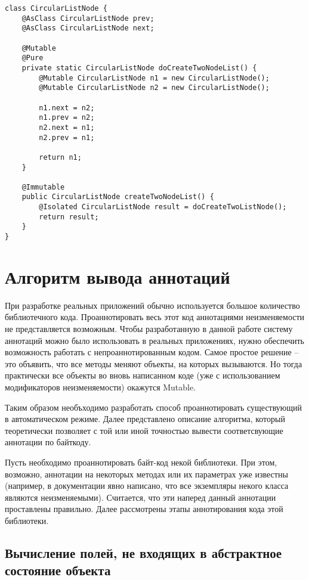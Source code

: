 \begin{lstlisting}[caption=CircularListNode.java, label=code:circular_list_node_isolated]
class CircularListNode {
    @AsClass CircularListNode prev;
    @AsClass CircularListNode next;
    
    @Mutable
    @Pure
    private static CircularListNode doCreateTwoNodeList() {
    	@Mutable CircularListNode n1 = new CircularListNode();
        @Mutable CircularListNode n2 = new CircularListNode();
    	
        n1.next = n2;
        n1.prev = n2;
        n2.next = n1;
        n2.prev = n1;
    
        return n1;  
    }
    
    @Immutable
    public CircularListNode createTwoNodeList() {
        @Isolated CircularListNode result = doCreateTwoListNode();
        return result;
    }
}
\end{lstlisting} 

\section{Алгоритм вывода аннотаций}

При разработке реальных приложений обычно используется большое количество библиотечного кода. Проаннотировать весь этот код аннотациями неизменяемости не представляется возможным. Чтобы разработанную в данной работе систему аннотаций можно было использовать в реальных приложениях, нужно обеспечить возможность работать с непроаннотированным кодом. Самое простое решение -- это объявить, что все методы меняют объекты, на которых вызываются. Но тогда практически все объекты во вновь написанном коде (уже с использованием модификаторов неизменяемости) окажутся Mutable. 

Таким образом необъходимо разработать способ проаннотировать существующий в автоматическом режиме. Далее представлено описание алгоритма, который теоретически позволяет с той или иной точностью вывести соответсвующие аннотации по байткоду. 

Пусть необходимо проаннотировать байт-код некой библиотеки. При этом, возможно, аннотации на некоторых методах или их параметрах уже известны (например, в документации явно написано, что все экземпляры некого класса являются неизменяемыми). Считается, что эти наперед данный аннотации проставлены правильно. Далее рассмотрены этапы аннотирования кода этой библиотеки.

\subsection{Вычисление полей, не входящих в абстрактное состояние объекта}


